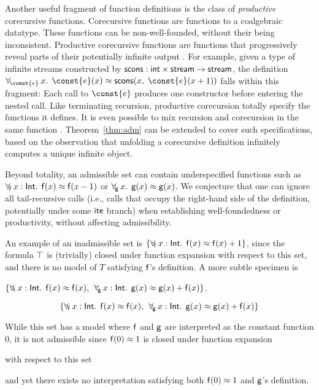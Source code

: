 \begin{longv}
Another useful fragment of function definitions is the class of
\emph{productive} corecursive functions. Corecursive functions are functions to
a coalgebraic datatype. These functions can be non-well-founded, without
their being inconsistent. Productive corecursive functions are functions that
progressively reveal parts of their potentially infinite
output \cite{turner-1995,mcbride-productive}.
For example, given a type of infinite streams constructed by
$\mathsf{scons} : \mathsf{int} \times \mathsf{stream} \to \mathsf{stream}$,
the definition
$\forallf{\const{e}} x.\;\, \const{e}(x) \teq \con{scons}(x,\; \const{e}(x + 1))$
falls within this fragment: Each call to $\const{e}$ produces one
constructor before entering the nested call. Like terminating recursion,
productive corecursion totally specify the functions it defines.
It is even possible to mix recursion and corecursion in the same function
\cite{blanchette-et-al-2015-fouco}. Theorem~\ref{thm:adm} can be extended to
cover such specifications, based on the observation that unfolding
a corecursive definition infinitely computes a unique infinite object.

Beyond totality, an admissible set can contain underspecified functions
such as $\forall_{\!\mathsf{f}\:} x : \mathsf{Int}.\allowbreak\;\, \mathsf{f}( x )
\approx \mathsf{f}( x - 1 )$ or $\forall_{\!\mathsf{g}\:} x.\allowbreak\;\, \mathsf{g}( x
) \approx \mathsf{g}( x )$. We conjecture that one can ignore all
tail-recursive calls (i.e., calls that occupy the right-hand side of the
definition, potentially under some $\mathsf{ite}$ branch) when establishing well-foundedness
or productivity, without affecting admissibility.
\end{longv}

\newcommand\badassex{
 \{\forallf{\con{f}} x : \typeint.\;\, \con{f}( x ) \teq \con{f}( x ),\;\,
 \forallf{\con{g}} x : \typeint.\;\, \con{g}( x ) \teq \con{g}( x ) + \nobreak\con{f}( x )\}}

An example of an inadmissible set is
$\{ \forall_{\!\mathsf{f}\:} x : \mathsf{Int}.\;\, \mathsf{f}( x ) \approx \mathsf{f}( x ) + 1 \}$,
since the formula $\top$ is (trivially) closed under function expansion with respect to this set,
and there is no model of $T$
satisfying $\mathsf{f}$'s definition. A more subtle specimen is
\begin{shortv}$\badassex$. \end{shortv}%
\begin{longv}\[\badassex\]\end{longv}%
While this set has a model where $\mathsf{f}$ and $\mathsf{g}$ are interpreted as the
constant function $0$, it is not admissible since %
$\mathsf{f}( 0 ) \approx 1$ is
closed under function expansion \begin{longv}with respect to this set\end{longv}
and yet there exists
no interpretation satisfying both $\mathsf{f}( 0 ) \approx 1$ and $\mathsf{g}$'s
definition.

